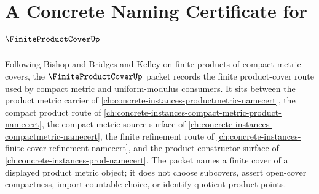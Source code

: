 \chapter{A Concrete Naming Certificate for $\FiniteProductCoverUp$}
\label{ch:concrete-instances-finite-product-cover-namecert}

Following Bishop and Bridges and Kelley on finite products of compact metric covers, the $\FiniteProductCoverUp$ packet records the finite product-cover route used by compact metric and uniform-modulus consumers. It sits between the product metric carrier of \autoref{ch:concrete-instances-productmetric-namecert}, the compact product route of \autoref{ch:concrete-instances-compact-metric-product-namecert}, the compact metric source surface of \autoref{ch:concrete-instances-compactmetric-namecert}, the finite refinement route of \autoref{ch:concrete-instances-finite-cover-refinement-namecert}, and the product constructor surface of \autoref{ch:concrete-instances-prod-namecert}. The packet names a finite cover of a displayed product metric object; it does not choose subcovers, assert open-cover compactness, import countable choice, or identify quotient product points.

